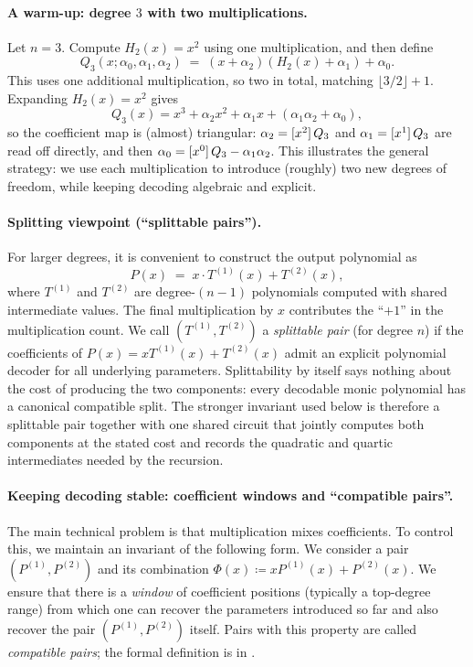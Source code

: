 \paragraph{A warm-up: degree $3$ with two multiplications.}
Let $n=3$.
Compute $H_2(x)=x^2$ using one multiplication, and then define
\[
   Q_3(x;\alpha_0,\alpha_1,\alpha_2) \;=\; (x+\alpha_2)(H_2(x)+\alpha_1)+\alpha_0.
\]
This uses one additional multiplication, so two in total, matching $\lfloor 3/2\rfloor+1$.
Expanding $H_2(x)=x^2$ gives
\[
   Q_3(x)=x^3 + \alpha_2 x^2 + \alpha_1 x + (\alpha_1\alpha_2+\alpha_0),
\]
so the coefficient map is (almost) triangular:
$\alpha_2=\coeff{Q_3}{2}$ and $\alpha_1=\coeff{Q_3}{1}$ are read off directly, and then $\alpha_0=\coeff{Q_3}{0}-\alpha_1\alpha_2$.
This illustrates the general strategy: we use each multiplication to introduce (roughly) two new degrees of freedom, while keeping decoding algebraic and explicit.

\paragraph{Splitting viewpoint (``splittable pairs'').}
For larger degrees, it is convenient to construct the output polynomial as
\[
   P(x) \;=\; x\cdot T^{(1)}(x) + T^{(2)}(x),
\]
where $T^{(1)}$ and $T^{(2)}$ are degree-$(n-1)$ polynomials computed with shared intermediate values.
The final multiplication by $x$ contributes the ``$+1$'' in the multiplication count.
We call $(T^{(1)},T^{(2)})$ a \emph{splittable pair} (for degree $n$) if the coefficients of $P(x)=xT^{(1)}(x)+T^{(2)}(x)$ admit an explicit polynomial decoder for all underlying parameters.
Splittability by itself says nothing about the cost of producing the two
components: every decodable monic polynomial has a canonical compatible
split.  The stronger invariant used below is therefore a splittable pair
together with one shared circuit that jointly computes both components at
the stated cost and records the quadratic and quartic intermediates needed
by the recursion.

\paragraph{Keeping decoding stable: coefficient windows and ``compatible pairs''.}
The main technical problem is that multiplication mixes coefficients.
To control this, we maintain an invariant of the following form.
We consider a pair $(P^{(1)},P^{(2)})$ and its combination $\Phi(x)\coloneqq xP^{(1)}(x)+P^{(2)}(x)$.
We ensure that there is a \emph{window} of coefficient positions (typically a top-degree range) from which one can recover the parameters introduced so far and also recover the pair $(P^{(1)},P^{(2)})$ itself.
Pairs with this property are called \emph{compatible pairs}; the formal definition is  in .

